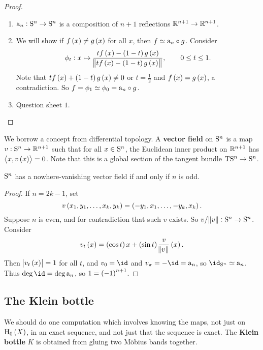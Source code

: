 \pagebreak

\begin{proof}
\hfill
\begin{enumerate}
\item $ \a_n : \S^n \to \S^n $ is a composition of $ n + 1 $ reflections $ \RR^{n + 1} \to \RR^{n + 1} $.
\item We will show if $ f\br{x} \ne g\br{x} $ for all $ x $, then $ f \simeq \a_n \circ g $. Consider
$$ \phi_t : x \mapsto \dfrac{tf\br{x} - \br{1 - t}g\br{x}}{\norm{tf\br{x} - \br{1 - t}g\br{x}}}, \qquad 0 \le t \le 1. $$
Note that $ tf\br{x} + \br{1 - t}g\br{x} \ne 0 $ or $ t = \tfrac{1}{2} $ and $ f\br{x} = g\br{x} $, a contradiction. So $ f = \phi_1 \simeq \phi_0 = \a_n \circ g $.
\item Question sheet $ 1 $.
\end{enumerate}
\end{proof}

We borrow a concept from differential topology. A \textbf{vector field} on $ \S^n $ is a map $ v : \S^n \to \RR^{n + 1} $ such that for all $ x \in \S^n $, the Euclidean inner product on $ \RR^{n + 1} $ has $ \abr{x, v\br{x}} = 0 $. Note that this is a global section of the tangent bundle $ \T\S^n \to \S^n $.

\begin{proposition}
$ \S^n $ has a nowhere-vanishing vector field if and only if $ n $ is odd.
\end{proposition}

\begin{proof}
If $ n = 2k - 1 $, set
$$ v\br{x_1, y_1, \dots, x_k, y_k} = \br{-y_1, x_1, \dots, -y_k, x_k}. $$
Suppose $ n $ is even, and for contradiction that such $ v $ exists. So $ v / \norm{v} : \S^n \to \S^n $. Consider
$$ v_t\br{x} = \br{\cos t}x + \br{\sin t}\dfrac{v}{\norm{v}}\br{x}. $$
Then $ \abs{v_t\br{x}} = 1 $ for all $ t $, and $ v_0 = \id $ and $ v_\pi = -\id = \a_n $, so $ \id_{\S^n} \simeq \a_n $. Thus $ \deg \id = \deg \a_n $, so $ 1 = \br{-1}^{n + 1} $.
\end{proof}

\subsection{The Klein bottle}


We should do one computation which involves knowing the maps, not just on $ \H_0\br{X} $, in an exact sequence, and not just that the sequence is exact. The \textbf{Klein bottle} $ K $ is obtained from gluing two M\"obius bands together.

